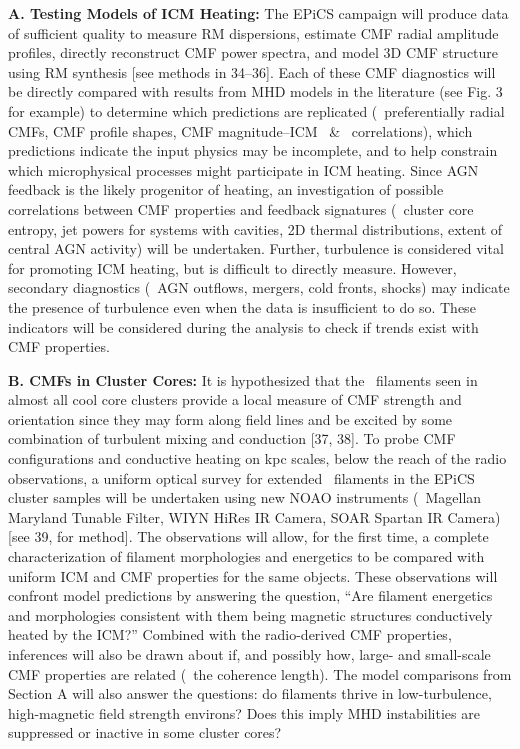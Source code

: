 \documentclass[letterpaper,12pt]{article}
\begin{document}
{\bf{A. Testing Models of ICM Heating:}} The EPiCS campaign will
produce data of sufficient quality to measure RM dispersions, estimate
CMF radial amplitude profiles, directly reconstruct CMF power spectra,
and model 3D CMF structure using RM synthesis [see methods in
  34--36]. Each of these CMF diagnostics will be directly compared
with results from MHD models in the literature (see Fig. 3 for
example) to determine which predictions are replicated
(\eg\ preferentially radial CMFs, CMF profile shapes, CMF
magnitude--ICM \nelec\ \& \tx\ correlations), which predictions
indicate the input physics may be incomplete, and to help constrain
which microphysical processes might participate in ICM heating. Since
AGN feedback is the likely progenitor of heating, an investigation of
possible correlations between CMF properties and feedback signatures
(\eg\ cluster core entropy, jet powers for systems with cavities, 2D
thermal distributions, extent of central AGN activity) will be
undertaken. Further, turbulence is considered vital for promoting ICM
heating, but is difficult to directly measure. However, secondary
diagnostics (\eg\ AGN outflows, mergers, cold fronts, shocks) may
indicate the presence of turbulence even when the data is insufficient
to do so. These indicators will be considered during the analysis to
check if trends exist with CMF properties.

{\bf{B. CMFs in Cluster Cores:}} It is hypothesized that the
\halpha\ filaments seen in almost all cool core clusters provide a
local measure of CMF strength and orientation since they may form
along field lines and be excited by some combination of turbulent
mixing and conduction [37, 38]. To probe CMF configurations and
conductive heating on kpc scales, below the reach of the radio
observations, a uniform optical survey for extended \halpha\ filaments
in the EPiCS cluster samples will be undertaken using new NOAO
instruments (\ie\ Magellan Maryland Tunable Filter, WIYN HiRes IR
Camera, SOAR Spartan IR Camera) [see 39, for method]. The observations
will allow, for the first time, a complete characterization of
filament morphologies and energetics to be compared with uniform ICM
and CMF properties for the same objects. These observations will
confront model predictions by answering the question, ``Are filament
energetics and morphologies consistent with them being magnetic
structures conductively heated by the ICM?''  Combined with the
radio-derived CMF properties, inferences will also be drawn about if,
and possibly how, large- and small-scale CMF properties are related
(\eg\ the coherence length). The model comparisons from Section A will
also answer the questions: do filaments thrive in low-turbulence,
high-magnetic field strength environs? Does this imply MHD
instabilities are suppressed or inactive in some cluster cores?
\end{document}
